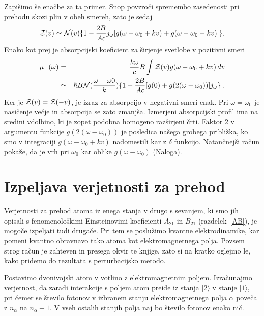 Zapišimo še enačbe za ta primer. Snop povzroči spremembo zasedenosti
pri prehodu skozi plin v obeh smereh, zato je sedaj 
\begin{equation}
{\cal Z}(v)\simeq{\cal N}(v)\{1-\frac{2B}{Ac}j_{\omega}[g(\omega-\omega_{0}+kv)+g(\omega-\omega_{0}-kv)]\}.\label{4.92}
\end{equation}
 Enako kot prej je absorpcijski koeficient za širjenje svetlobe v
pozitivni smeri 
\begin{eqnarray}
\mu_{+}(\omega) & = & \frac{\hbar\omega}{c}B\int{\cal Z}(v)g(\omega-\omega_{0}+kv)\, dv\nonumber \\
 & \simeq & \hbar B{\cal N}(\frac{\omega-\omega0}{k})\{1-\frac{2B}{Ac}[g(0)+g(2(\omega-\omega_{0}))]j_{\omega}\}\;.
\end{eqnarray}
 Ker je ${\cal Z}(v)={\cal Z}(-v)$, je izraz za absorpcijo v negativni
smeri enak. Pri $\omega=\omega_{0}$ je nasičenje večje in absorpcija
se zato zmanjša. Izmerjeni absorpcijski profil ima na sredini vdolbino,
ki je zopet podobna homogeno razširjeni črti. Faktor 2 v argumentu
funkcije $g(2(\omega-\omega_{0}))$ je posledica našega grobega približka,
ko smo v integraciji $g(\omega-\omega_{0}+kv)$ nadomestili kar z
$\delta$ funkcijo. Natančnejši račun pokaže, da je vrh pri $\omega_{0}$
kar oblike $g(\omega-\omega_{0})$ (Naloga).


\section{Izpeljava verjetnosti za prehod}
\label{chap:verjetnost}
Verjetnosti za prehod atoma iz enega stanja v drugo s sevanjem, ki
smo jih opisali s fenomenološkimi Einsteinovimi koeficienti $A_{21}$
in $B_{21}$ (razdelek~\ref{AB}), je mogoče izpeljati tudi drugače.
Pri tem se poslužimo kvantne elektrodinamike, kar pomeni kvantno obravnavo 
tako atoma kot elektromagnetnega polja. Povsem strog račun je zahteven in presega
okvir te knjige, zato si na kratko oglejmo le, kako pridemo do rezultata s
perturbacijsko metodo.


Postavimo dvonivojski atom v votlino z elektromagnetnim poljem.
Izračunajmo verjetnost, da zaradi interakcije s poljem atom
preide iz stanja $|2\rangle$ v stanje $|1\rangle$, pri čemer se
število fotonov v izbranem stanju elektromagnetnega polja $\alpha$
poveča z $n_{\alpha}$ na $n_{\alpha}+1$. V vseh ostalih stanjih
polja naj bo število fotonov enako nič.


